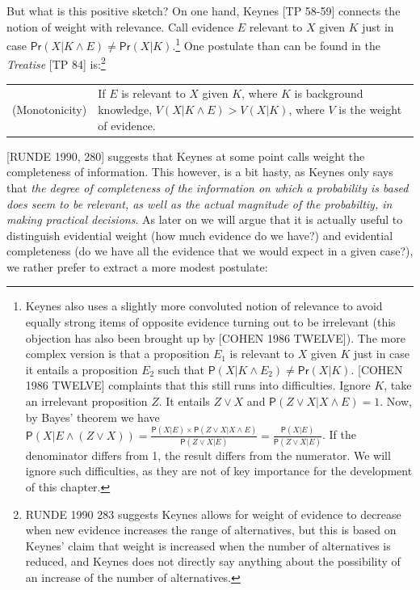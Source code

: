 \documentclass[
  10pt,
  dvipsnames,enabledeprecatedfontcommands]{scrartcl}
\newcommand{\pr}[1]{\mathsf{P}(#1)}
\begin{document}
But what is this positive sketch? On one hand, Keynes {[}TP 58-59{]}
connects the notion of weight with relevance. Call evidence \(E\)
relevant to \(X\) given \(K\) just in case
\(\mathsf{Pr}(X\vert K \wedge E) \neq \mathsf{Pr}(X \vert K)\).\footnote{
  Keynes also uses a slightly more convoluted notion of relevance to
  avoid equally strong items of opposite evidence turning out to be
  irrelevant (this objection has also been brought up by {[}COHEN 1986
  TWELVE{]}). The more complex version is that a proposition \(E_1\) is
  relevant to \(X\) given \(K\) just in case it entails a proposition
  \(E_2\) such that
  \(\pr{X\vert K \wedge E_2} \neq \mathsf{Pr}(X \vert K)\). {[}COHEN
  1986 TWELVE{]} complaints that this still runs into difficulties.
  Ignore \(K\), take an irrelevant proposition \(Z\). It entails
  \(Z\vee X\) and \(\pr{Z \vee X\vert X \wedge E}=1\). Now, by Bayes'
  theorem we have
  \(\pr{X \vert E \wedge (Z \vee X)} = \frac{\pr{X \vert E}\times \pr{Z \vee X \vert X \wedge E}}{\pr{Z \vee X \vert E}} = \frac{\pr{X \vert E}}{\pr{Z \vee X \vert E}}\).
  If the denominator differs from 1, the result differs from the
  numerator. We will ignore such difficulties, as they are not of key
  importance for the development of this chapter.} One postulate than
can be found in the \emph{Treatise} {[}TP 84{]} is:\footnote{RUNDE 1990
  283 suggests Keynes allows for weight of evidence to decrease when new
  evidence increases the range of alternatives, but this is based on
  Keynes' claim that weight is increased when the number of alternatives
  is reduced, and Keynes does not directly say anything about the
  possibility of an increase of the number of alternatives.}

\begin{tabular}{lp{11cm}}
(Monotonicity) & If $E$ is relevant to $X$ given $K$, where $K$ is background knowledge, $V(X\vert K \wedge E) > V(X\vert K)$, where $V$ is the weight of evidence.
\end{tabular}

{[}RUNDE 1990, 280{]} suggests that Keynes at some point calls weight
the completeness of information. This however, is a bit hasty, as Keynes
only says that
\emph{the degree of completeness of the information on which a probability is based does seem to be relevant, as well as the actual magnitude of the probabiltiy, in making practical decisions}.
As later on we will argue that it is actually useful to distinguish
evidential weight (how much evidence do we have?) and evidential
completeness (do we have all the evidence that we would expect in a
given case?), we rather prefer to extract a more modest postulate:
\end{document}
